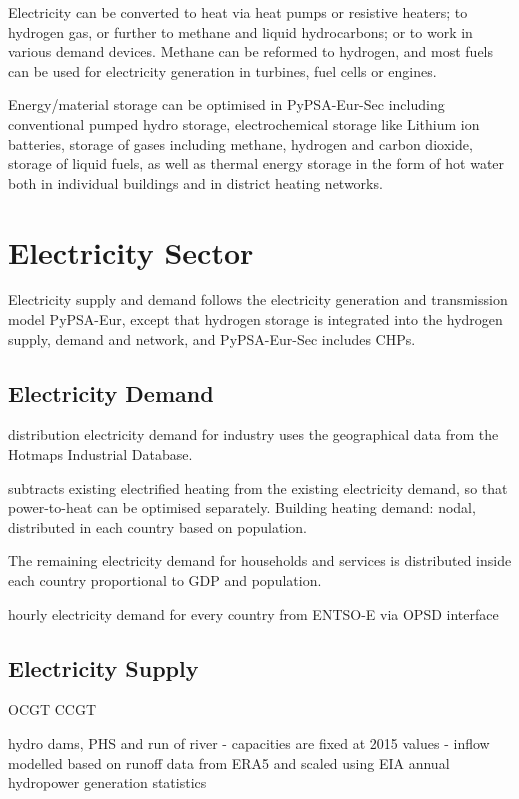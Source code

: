 Electricity can be converted to heat via heat pumps or resistive heaters; to
hydrogen gas, or further to methane and liquid hydrocarbons; or to work in
various demand devices. Methane can be reformed to hydrogen, and most fuels can
be used for electricity generation in turbines, fuel cells or engines.

Energy/material storage can be optimised in PyPSA-Eur-Sec including conventional
pumped hydro storage, electrochemical storage like Lithium ion batteries,
storage of gases including methane, hydrogen and carbon dioxide, storage of
liquid fuels, as well as thermal energy storage in the form of hot water both in
individual buildings and in district heating networks.

\section{Electricity Sector}

Electricity supply and demand follows the electricity generation and
transmission model PyPSA-Eur, except that hydrogen storage is integrated into
the hydrogen supply, demand and network, and PyPSA-Eur-Sec includes CHPs.


\subsection{Electricity Demand}

distribution electricity demand for
industry uses the geographical data from
the Hotmaps Industrial Database.

subtracts existing electrified heating from
the existing electricity demand, so that power-to-heat can be optimised
separately.
Building heating demand: nodal, distributed in each country based on population.

The remaining electricity demand for households and services is distributed
inside each country proportional to GDP and population.

hourly electricity demand for every country from ENTSO-E via OPSD interface

\subsection{Electricity Supply}

OCGT CCGT

hydro dams, PHS and run of river
- capacities are fixed at 2015 values
- inflow modelled based on runoff data from ERA5 and scaled using EIA annual hydropower generation statistics

